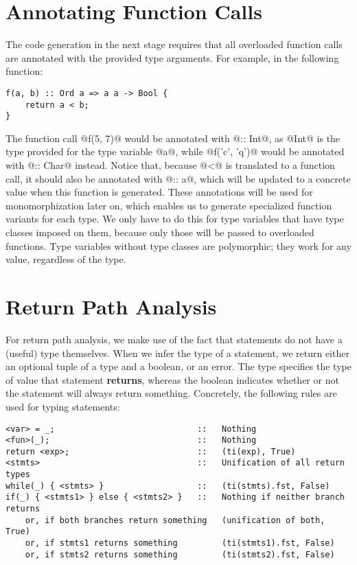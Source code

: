 \section{Annotating Function Calls}
The code generation in the next stage requires that all overloaded function calls are annotated with the provided type arguments. For example, in the following function:
\begin{lstlisting}
f(a, b) :: Ord a => a a -> Bool {
    return a < b;
}
\end{lstlisting}
The function call @f(5, 7)@ would be annotated with @:: Int@, as @Int@ is the type provided for the type variable @a@, while @f('c', 'q')@ would be annotated with @:: Char@ instead. Notice that, because @<@ is translated to a function call, it should also be annotated with @:: a@, which will be updated to a concrete value when this function is generated. These annotations will be used for monomorphization later on, which enables us to generate specialized function variants for each type. We only have to do this for type variables that have type classes imposed on them, because only those will be passed to overloaded functions. Type variables without type classes are polymorphic; they work for any value, regardless of the type.

\section{Return Path Analysis}
For return path analysis, we make use of the fact that statements do not have a (useful) type themselves. When we infer the type of a statement, we return either an optional tuple of a type and a boolean, or an error. The type specifies the type of value that statement \textbf{returns}, whereas the boolean indicates whether or not the statement will always return something. Concretely, the following rules are used for typing statements:
\begin{lstlisting}
<var> = _;                             ::   Nothing
<fun>(_);                              ::   Nothing
return <exp>;                          ::   (ti(exp), True)
<stmts>                                ::   Unification of all return types
while(_) { <stmts> }                   ::   (ti(stmts).fst, False)
if(_) { <stmts1> } else { <stmts2> }   ::   Nothing if neither branch returns
    or, if both branches return something   (unification of both, True)
    or, if stmts1 returns something         (ti(stmts1).fst, False)
    or, if stmts2 returns something         (ti(stmts2).fst, False)
\end{lstlisting}

